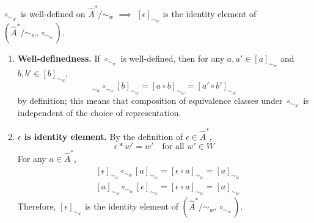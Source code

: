 \begin{propositionE}
    $\circ_{\sim_{w}}$ is well-defined on $\hat{A}^{*}/\sim_{w}$ $\implies$ $[\epsilon]_{\sim_{w}}$ is the identity element of $(\hat{A}^{*}/\sim_{w}, \circ_{\sim_{w}})$.
\end{propositionE}
\begin{proofE}
\begin{enumerate}[(1)]
    \item \textbf{Well-definedness.}
    If $\circ_{\sim_{w}}$ is well-defined, then for any $a, a' \in [a]_{\sim_{w}}$ and $b, b' \in [b]_{\sim_{w}}$,
    \begin{equation}
        [a]_{\sim_{w}} \circ_{\sim_{w}} [b]_{\sim_{w}} = [a \circ b]_{\sim_{w}} = [a' \circ b']_{\sim_{w}}
    \end{equation}
    by definition; this means that composition of equivalence classes under $\circ_{\sim_{w}}$ is independent of the choice of representation.

    \item \textbf{$\epsilon$ is identity element.}
    By the definition of $\epsilon \in \hat{A}^{*}$,
    \begin{equation}
        \epsilon \ast w' = w' \quad \text{for all $w' \in W$}
    \end{equation}
    For any $a \in \hat{A}^{*}$,
    \begin{align}
        & [\epsilon]_{\sim_{w}} \circ_{\sim_{w}} [a]_{\sim_{w}} = [\epsilon \circ a]_{\sim_{w}} = [a]_{\sim_{w}} \\
        & [a]_{\sim_{w}} \circ_{\sim_{w}} [\epsilon]_{\sim_{w}} = [\epsilon \circ a]_{\sim_{w}} = [a]_{\sim_{w}}
    \end{align}
    Therefore, $[\epsilon]_{\sim_{w}}$ is the identity element of $(\hat{A}^{*}/\sim_{w}, \circ_{\sim_{w}})$.
\end{enumerate}
\end{proofE}


